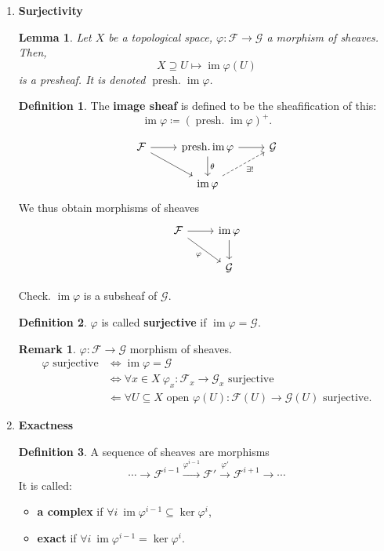 \documentclass[12pt]{article}
\DeclareMathOperator{\im}{im}
\DeclareMathOperator{\presh}{presh.}
\newtheorem*{lemma}{Lemma}
\theoremstyle{definition}
\newtheorem*{definition}{Definition}
\newtheorem*{remark}{Remark}
\theoremstyle{remark}
\begin{document}
\begin{enumerate}[label=\arabic*)]
\item \textbf{Surjectivity}

\begin{lemma}
Let $X$ be a topological space, $\varphi:\mathcal{F}\rightarrow\mathcal{G}$ a morphism of sheaves. Then,
\[X\supseteq U\longmapsto\im\varphi(U)\]
is a presheaf. It is denoted $\presh\im\varphi$.
\end{lemma}

\begin{definition}
The \textbf{image sheaf} is defined to be the sheafification of this:
\[\im\varphi\coloneqq(\presh\im\varphi)^+.\]
\end{definition}

\[
\begin{tikzcd}
\mathcal{F}\arrow[r]\arrow[rd]&\presh\im\varphi\arrow[r]\arrow[d,"\theta"]&\mathcal{G}\\
&\im\varphi\arrow[ru,dashed,"\exists!",swap]
\end{tikzcd}
\]
We thus obtain morphisms of sheaves
\[
\begin{tikzcd}
\mathcal{F}\arrow[r]\arrow[rd,"\varphi",swap]&\im\varphi\arrow[d]\\
&\mathcal{G}
\end{tikzcd}
\]

Check. $\im\varphi$ is a subsheaf of $\mathcal{G}$.

\begin{definition}
$\varphi$ is called \textbf{surjective} if $\im\varphi=\mathcal{G}$.
\end{definition}

\begin{remark}
$\varphi:\mathcal{F}\rightarrow\mathcal{G}$ morphism of sheaves.
\begin{align*}
\varphi\text{ surjective}&\Longleftrightarrow\im\varphi=\mathcal{G}\\
&\Longleftrightarrow\forall x\in X\ \varphi_x:\mathcal{F}_x\rightarrow\mathcal{G}_x\text{ surjective}\\
&\Longleftarrow\forall U\subseteq X\text{ open }\varphi(U):\mathcal{F}(U)\rightarrow\mathcal{G}(U)\text{ surjective}.
\end{align*}
\end{remark}

\item \textbf{Exactness}

\begin{definition}
A sequence of sheaves are morphisms
\[\cdots\longrightarrow\mathcal{F}^{i-1}\xrightarrow{\varphi^{i-1}}\mathcal{F}'\overset{\varphi'}{\longrightarrow}\mathcal{F}^{i+1}\longrightarrow\cdots\]
It is called:
\begin{itemize}
\item \textbf{a complex} if $\forall i\ \im\varphi^{i-1}\subseteq\ker\varphi^i$,
\item \textbf{exact} if $\forall i\ \im\varphi^{i-1}=\ker\varphi^i$.
\end{itemize}
\end{definition}


\end{enumerate}
\end{document}
